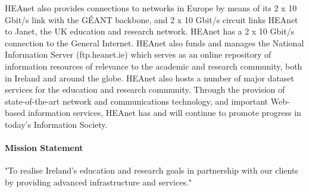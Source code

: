 \documentclass{article}
\begin{document}
	HEAnet also provides connections to networks in Europe by means of its 2 x 10 Gbit/s link with the GÉANT backbone, and 2 x 10 Gbit/s circuit links HEAnet to Janet, the UK education and research network. HEAnet has a 2 x 10 Gbit/s connection to the General Internet. HEAnet also funds and manages the National Information Server (ftp.heanet.ie) which serves as an online repository of information resources of relevance to the academic and research community, both in Ireland and around the globe. HEAnet also hosts a number of major dataset services for the education and research community. Through the provision of state-of-the-art network and communications technology, and important Web-based information services, HEAnet has and will continue to promote progress in today's Information Society.
	
	\paragraph{Mission Statement}
	"To realise Ireland's education and research goals in partnership with our clients by providing advanced infrastructure and services."
\end{document}

